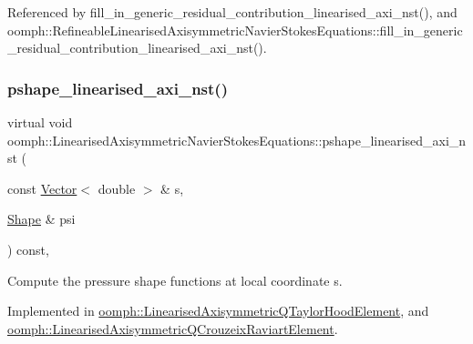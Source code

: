 Referenced by fill\+\_\+in\+\_\+generic\+\_\+residual\+\_\+contribution\+\_\+linearised\+\_\+axi\+\_\+nst(), and oomph\+::\+Refineable\+Linearised\+Axisymmetric\+Navier\+Stokes\+Equations\+::fill\+\_\+in\+\_\+generic\+\_\+residual\+\_\+contribution\+\_\+linearised\+\_\+axi\+\_\+nst().

\mbox{\label{classoomph_1_1LinearisedAxisymmetricNavierStokesEquations_a86dd84e88a2f10e33f61b1a09c8aefd7}} 
\subsubsection{\texorpdfstring{pshape\+\_\+linearised\+\_\+axi\+\_\+nst()}{pshape\_linearised\_axi\_nst()}\hspace{0.1cm}{\footnotesize\ttfamily [1/2]}}
{\footnotesize\ttfamily virtual void oomph\+::\+Linearised\+Axisymmetric\+Navier\+Stokes\+Equations\+::pshape\+\_\+linearised\+\_\+axi\+\_\+nst (\begin{DoxyParamCaption}\item[{const \hyperlink{classoomph_1_1Vector}{Vector}$<$ double $>$ \&}]{s,  }\item[{\hyperlink{classoomph_1_1Shape}{Shape} \&}]{psi }\end{DoxyParamCaption}) const\hspace{0.3cm}{\ttfamily [protected]}, {}}



Compute the pressure shape functions at local coordinate s. 



Implemented in \hyperlink{classoomph_1_1LinearisedAxisymmetricQTaylorHoodElement_a48fa05d60b707ef51decf0fb829ed8ee}{oomph\+::\+Linearised\+Axisymmetric\+Q\+Taylor\+Hood\+Element}, and \hyperlink{classoomph_1_1LinearisedAxisymmetricQCrouzeixRaviartElement_aa04596314af005c461482c54e086f252}{oomph\+::\+Linearised\+Axisymmetric\+Q\+Crouzeix\+Raviart\+Element}.



